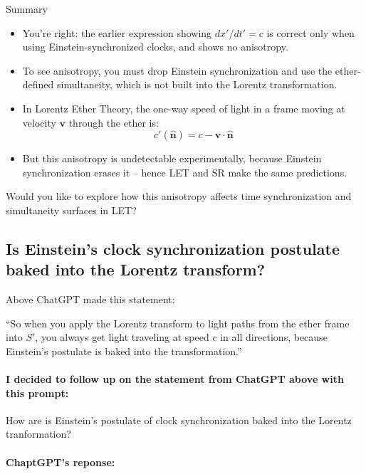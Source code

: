 \documentclass[a4paper]{article}
\theoremstyle{plain}
\theoremstyle{definition}
\newcommand{\vect}[1]{\mathbf{#1}}
\newcommand{\hatvec}[1]{\hat{\mathbf{#1}}}
\begin{document}
Summary

\begin{itemize}

\item You're right: the earlier expression showing $dx'/dt' = c$ is
  correct only when using Einstein-synchronized clocks, and shows no
  anisotropy.

\item To see anisotropy, you must drop Einstein synchronization and
  use the ether-defined simultaneity, which is not built into the
  Lorentz transformation.

\item In Lorentz Ether Theory, the one-way speed of light in a frame
  moving at velocity $\vect{v}$ through the ether is:
\begin{equation}
c'(\hatvec{n}) = c - \vect{v} \cdot \hatvec{n}
\end{equation}

\item But this anisotropy is undetectable experimentally, because
  Einstein synchronization erases it -- hence LET and SR make the same
  predictions.
\end{itemize}

Would you like to explore how this anisotropy affects time
synchronization and simultaneity surfaces in LET?


\subsection{Is Einstein's clock synchronization postulate baked into the Lorentz transform?}

Above ChatGPT made this statement:

``So when you apply the Lorentz transform to light paths from the
ether frame into $S'$, you always get light traveling at speed $c$ in
all directions, because Einstein's postulate is baked into the
transformation.''

\paragraph{I decided to follow up on the statement from ChatGPT above with this prompt:}

How are is Einstein's postulate of clock synchronization baked into
the Lorentz tranformation?

\paragraph{ChaptGPT's reponse:}
\end{document}
